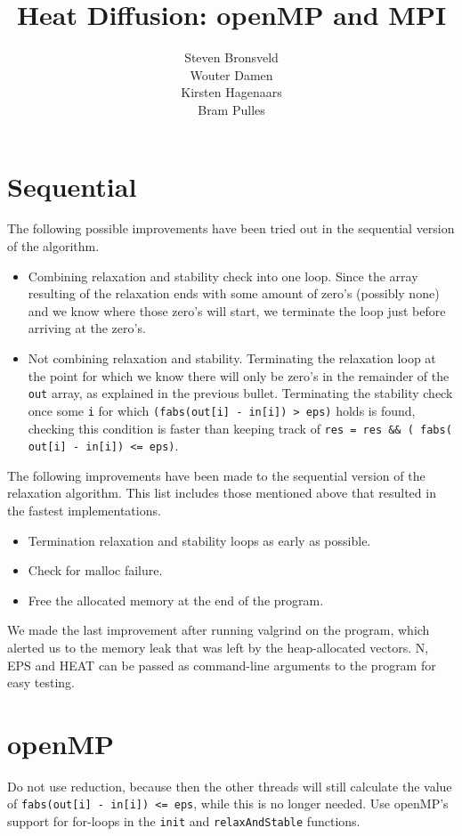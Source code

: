 \documentclass[a4paper]{article}
\author{Steven Bronsveld\\Wouter Damen\\Kirsten Hagenaars\\Bram Pulles}
\title{\textbf{Heat Diffusion: openMP and MPI}}
\begin{document}
\maketitle

\tableofcontents

\pagebreak
\section{Sequential}
The following possible improvements have been tried out in the sequential version of the algorithm.
\begin{itemize}
    \item Combining relaxation and stability check into one loop. Since the array resulting of the relaxation ends with some amount of zero's (possibly none) and we know where those zero's will start, we terminate the loop just before arriving at the zero's.
    \item Not combining relaxation and stability. Terminating the relaxation loop at the point for which we know there will only be zero's in the remainder of the \texttt{out} array, as explained in the previous bullet. Terminating the stability check once some \texttt{i} for which \texttt{(fabs(out[i] - in[i]) > eps)} holds is found, checking this condition is faster than keeping track of \texttt{res = res \&\& ( fabs( out[i] - in[i]) <= eps)}.
\end{itemize}
The following improvements have been made to the sequential version of the relaxation algorithm. This list includes those mentioned above that resulted in the fastest implementations.
\begin{itemize}
    \item Termination relaxation and stability loops as early as possible.
    \item Check for malloc failure.
    \item Free the allocated memory at the end of the program.
\end{itemize}
We made the last improvement after running valgrind on the program, which alerted us to the memory leak that was left by the heap-allocated vectors. 
N, EPS and HEAT can be passed as command-line arguments to the program for easy testing.

\section{openMP}

Do not use reduction, because then the other threads will still calculate the value of 
\texttt{fabs(out[i] - in[i]) <= eps}, while this is no longer needed. Use openMP's support for for-loops in the \texttt{init} and \texttt{relaxAndStable} functions.
\end{document}
